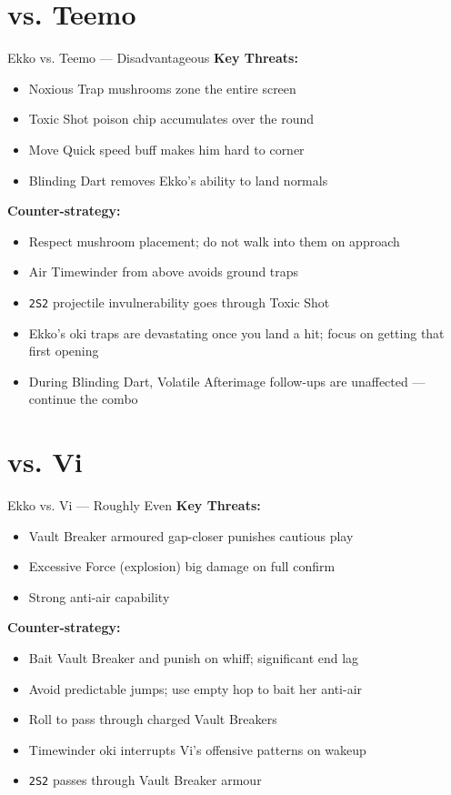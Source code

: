 \documentclass[12pt, a4paper]{report}
\newcommand{\notation}[1]{{\small\texttt{\textcolor{ekkoBlue}{#1}}}}
\newcommand{\champ}[1]{\textcolor{ekkoAccent}{\textbf{#1}}}
\begin{document}
\section{vs. \champ{Teemo}}

\begin{matchupbox}[]{Ekko vs. Teemo --- Disadvantageous}
\textbf{Key Threats:}
\begin{itemize}
  \item Noxious Trap mushrooms zone the entire screen
  \item Toxic Shot poison chip accumulates over the round
  \item Move Quick speed buff makes him hard to corner
  \item Blinding Dart removes Ekko's ability to land normals
\end{itemize}
\textbf{Counter-strategy:}
\begin{itemize}
  \item Respect mushroom placement; do not walk into them on approach
  \item Air Timewinder from above avoids ground traps
  \item \notation{2S2} projectile invulnerability goes through Toxic Shot
  \item Ekko's oki traps are devastating once you land a hit; focus on getting that first opening
  \item During Blinding Dart, Volatile Afterimage follow-ups are unaffected --- continue the combo
\end{itemize}
\end{matchupbox}

\section{vs. \champ{Vi}}

\begin{matchupbox}[]{Ekko vs. Vi --- Roughly Even}
\textbf{Key Threats:}
\begin{itemize}
  \item Vault Breaker armoured gap-closer punishes cautious play
  \item Excessive Force (explosion) big damage on full confirm
  \item Strong anti-air capability
\end{itemize}
\textbf{Counter-strategy:}
\begin{itemize}
  \item Bait Vault Breaker and punish on whiff; significant end lag
  \item Avoid predictable jumps; use empty hop to bait her anti-air
  \item Roll to pass through charged Vault Breakers
  \item Timewinder oki interrupts Vi's offensive patterns on wakeup
  \item \notation{2S2} passes through Vault Breaker armour
\end{itemize}
\end{matchupbox}
\end{document}
